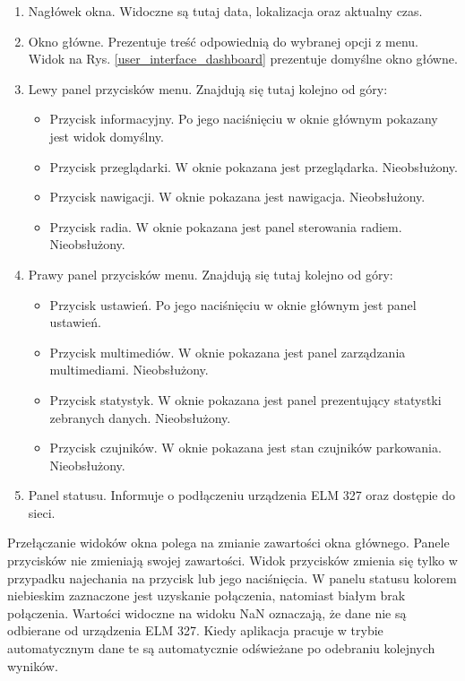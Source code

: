 \documentclass[12pt]{article} %
\numberwithin{equation}{subsection}
\numberwithin{figure}{section}
\numberwithin{table}{section}
\begin{document}
		\begin{enumerate}
			\item{Nagłówek okna. Widoczne są tutaj data, lokalizacja oraz aktualny czas.}
			\item{Okno główne. Prezentuje treść odpowiednią do wybranej opcji z menu. Widok na Rys. \ref{user_interface_dashboard} prezentuje domyślne okno główne.}
			\item{Lewy panel przycisków menu. Znajdują się tutaj kolejno od góry:
				\begin{itemize}
					\item{Przycisk informacyjny. Po jego naciśnięciu w oknie głównym pokazany jest widok domyślny.}
					\item{Przycisk przeglądarki. W oknie pokazana jest przeglądarka. Nieobsłużony.}
					\item{Przycisk nawigacji. W oknie pokazana jest nawigacja. Nieobsłużony.}
					\item{Przycisk radia. W oknie pokazana jest panel sterowania radiem. Nieobsłużony.}
				\end{itemize}						
			}
			\item{Prawy panel przycisków menu. Znajdują się tutaj kolejno od góry:
				\begin{itemize}
					\item{Przycisk ustawień. Po jego naciśnięciu w oknie głównym jest panel ustawień.}
					\item{Przycisk multimediów. W oknie pokazana jest panel zarządzania multimediami. Nieobsłużony.}
					\item{Przycisk statystyk. W oknie pokazana jest panel prezentujący statystki zebranych danych. Nieobsłużony.}
					\item{Przycisk czujników. W oknie pokazana jest stan czujników parkowania. Nieobsłużony.}
				\end{itemize}						
			}
			\item{Panel statusu. Informuje o podłączeniu urządzenia ELM 327 oraz dostępie do sieci.}
		\end{enumerate}
		
		Przełączanie widoków okna polega na zmianie zawartości okna głównego. Panele przycisków nie zmieniają swojej zawartości. Widok przycisków zmienia się tylko w przypadku najechania na przycisk lub jego naciśnięcia. W panelu statusu kolorem niebieskim zaznaczone jest uzyskanie połączenia, natomiast białym brak połączenia. Wartości widoczne na widoku NaN oznaczają, że dane nie są odbierane od urządzenia ELM 327. Kiedy aplikacja pracuje w trybie automatycznym dane te są automatycznie odświeżane po odebraniu kolejnych wyników. 
		
\end{document}
